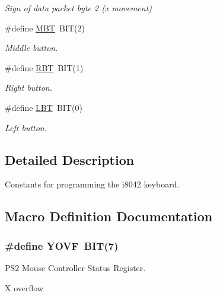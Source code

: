 \begin{DoxyCompactItemize}
\begin{DoxyCompactList}\small\item\em Sign of data packet byte 2 (x movement) \end{DoxyCompactList}\item 
\hypertarget{group__i8042_gab4abb667b74797a9a64f95d388c4da75}{\#define \hyperlink{group__i8042_gab4abb667b74797a9a64f95d388c4da75}{M\-B\-T}~B\-I\-T(2)}\label{group__i8042_gab4abb667b74797a9a64f95d388c4da75}

\begin{DoxyCompactList}\small\item\em Middle button. \end{DoxyCompactList}\item 
\hypertarget{group__i8042_gabc6d7bd471913c986a226a3893174dfc}{\#define \hyperlink{group__i8042_gabc6d7bd471913c986a226a3893174dfc}{R\-B\-T}~B\-I\-T(1)}\label{group__i8042_gabc6d7bd471913c986a226a3893174dfc}

\begin{DoxyCompactList}\small\item\em Right button. \end{DoxyCompactList}\item 
\hypertarget{group__i8042_ga6bec57496b9c9cc22e12e62997e5be91}{\#define \hyperlink{group__i8042_ga6bec57496b9c9cc22e12e62997e5be91}{L\-B\-T}~B\-I\-T(0)}\label{group__i8042_ga6bec57496b9c9cc22e12e62997e5be91}

\begin{DoxyCompactList}\small\item\em Left button. \end{DoxyCompactList}\end{DoxyCompactItemize}


\subsection{Detailed Description}
Constants for programming the i8042 keyboard. 

\subsection{Macro Definition Documentation}
\hypertarget{group__i8042_ga08deb639aef83c70892a364261b09133}{
\subsubsection[{Y\-O\-V\-F}]{\setlength{\rightskip}{0pt plus 5cm}\#define Y\-O\-V\-F~B\-I\-T(7)}}\label{group__i8042_ga08deb639aef83c70892a364261b09133}


P\-S2 Mouse Controller Status Register. 

X overflow 